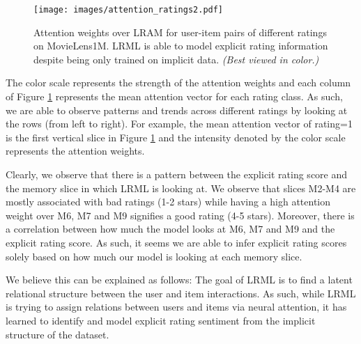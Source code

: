 \documentclass[sigconf]{acmart}
\begin{document}
\begin{figure}[ht]
\begin{center}
\texttt{[image: images/attention\_ratings2.pdf]}
\caption{Attention weights over LRAM for user-item pairs of different ratings on MovieLens1M. \textsc{LRML} is able to model explicit rating information
despite being only trained on implicit data. \textit{(Best viewed in color.)} }
\label{attention_rating}
\end{center}
\end{figure}


 The color scale represents the strength of the attention weights and each column of Figure \ref{attention_rating} represents the mean attention vector for each rating class. As such, we are able to observe patterns and trends across different ratings by looking at the rows (from left to right). For example, the mean attention vector of rating=1 is the first vertical slice in Figure \ref{attention_rating} and the intensity denoted by the color scale represents the attention weights. 

 Clearly, we observe that there is a pattern between the explicit rating score and the memory slice in which \textsc{LRML} is looking at. We observe that slices M2-M4 are mostly associated with bad ratings (1-2 stars) while having a high attention weight over M6, M7 and M9 signifies a good rating (4-5 stars). Moreover, there is a correlation between how much the model looks at M6, M7 and M9 and the explicit rating score. As such, it seems we are able to infer explicit rating scores solely based on how much our model is looking at each memory slice. 

 We believe this can be explained as follows: The goal of \textsc{LRML} is to find a latent relational structure between the user and item interactions. As such, while \textsc{LRML} is trying to assign relations between users and items via neural attention, it has learned to identify and model explicit rating sentiment from the implicit structure of the dataset. 
\end{document}
